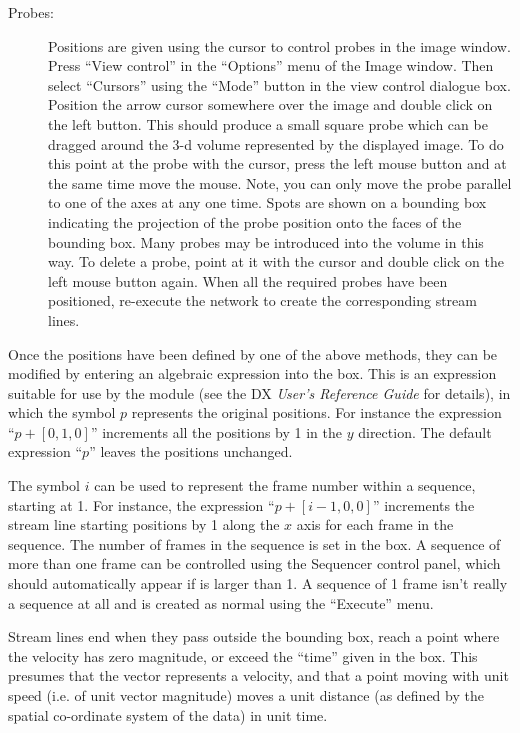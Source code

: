 \begin{description}
\begin{description}
\item [Probes:]
Positions are given using the cursor to control probes in the image
window. Press ``View control'' in the ``Options'' menu of the Image window.
Then select ``Cursors'' using the ``Mode'' button in the view control
dialogue box. Position the arrow cursor somewhere over the image and
double click on the left button. This should produce a small square
probe which can be dragged around the 3-d volume represented by the
displayed image. To do this point at the probe with the cursor, press the
left mouse button and at the same time move the mouse. Note, you can only
move the probe parallel to one of the axes at any one time. Spots are
shown on a bounding box indicating the projection of the probe position
onto the faces of the bounding box. Many probes may be introduced into
the volume in this way. To delete a probe, point at it with the cursor
and double click on the left mouse button again. When all the required
probes have been positioned, re-execute the network to create the
corresponding stream lines.

\end{description}

Once the positions have been defined by one of the above methods, they
can be modified by entering an algebraic expression into the
 box. This is an expression suitable for use by the
 module (see the DX {\em User's Reference Guide} for details), in which
the symbol $p$ represents the original positions. For instance the
expression ``$p+[0,1,0]$'' increments all the positions by 1 in
the $y$
direction. The default expression ``$p$'' leaves the positions unchanged.

The symbol $i$ can be used to represent the frame number within a
sequence, starting at 1.  For instance, the expression
``$p+[i-1,0,0]$''
increments the stream line starting positions by 1 along the $x$ axis for
each frame in the sequence. The number of frames in the sequence is set
in the  box. A sequence of more than one frame can
be controlled using the Sequencer control panel, which should
automatically appear if  is larger than 1. A
sequence of 1 frame isn't really a sequence at all and is created as
normal using the ``Execute'' menu.

Stream lines end when they pass outside the bounding box, reach a point
where the velocity has zero magnitude, or exceed the ``time'' given in the
 box. This presumes that the vector represents a
velocity, and that a point moving with unit speed (i.e. of unit vector
magnitude) moves a unit distance (as defined by the spatial co-ordinate
system of the data) in unit time.


\end{description}

